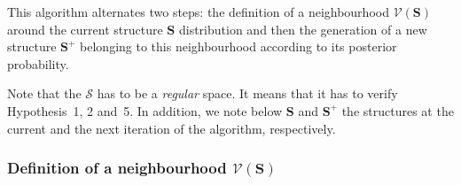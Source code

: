 \documentclass[11pt,a4paper]{article}
\begin{document}
This algorithm alternates two steps: the definition of a neighbourhood $\mathcal{V}(\boldsymbol{S})$ around the current structure $\boldsymbol{S}$ distribution and then the generation of a new structure $\boldsymbol{S}^+$ belonging to this neighbourhood according to its posterior probability.

Note that the $\mathcal{S}$ has to be a {\it regular} space. It means that it has to verify Hypothesis~1, 2 and~5. In addition, we note below $\boldsymbol{S}$ and $\boldsymbol{S}^+$ the structures at the current and the next iteration of the algorithm, respectively.

	\subsubsection{Definition of a neighbourhood $\mathcal{V}(\boldsymbol{S})$}
\end{document}
